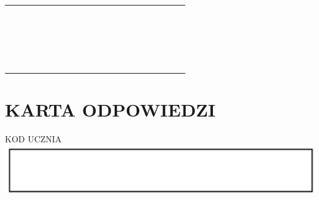 \documentclass[10pt]{article}
\begin{document}
\begin{center}
\begin{tabular}{|c|c|c|c|c|c|c|c|c|c|c|c|c|c|c|c|c|c|c|c|c|}
\hline
 &  &  &  &  &  &  &  &  &  &  &  &  &  &  &  &  &  &  &  &  \\
\hline
 &  &  &  &  &  &  &  &  &  &  &  &  &  &  &  &  &  &  &  &  \\
\hline
 &  &  &  &  &  &  &  &  &  &  &  &  &  &  &  &  &  &  &  &  \\
\hline
 &  &  &  &  &  &  &  &  &  &  &  &  &  &  &  &  &  &  &  &  \\
\hline
 &  &  &  &  &  &  &  &  &  &  &  &  &  &  &  &  &  &  &  &  \\
\hline
 &  &  &  &  &  &  &  &  &  &  &  &  &  &  &  &  &  &  &  &  \\
\hline
 &  &  &  &  &  &  &  &  &  &  &  &  &  &  &  &  &  &  &  &  \\
\hline
 &  &  &  &  &  &  &  &  &  &  &  &  &  &  &  &  &  &  &  &  \\
\hline
 &  &  &  &  &  &  &  &  &  &  &  &  &  &  &  &  &  &  &  &  \\
\hline
 &  &  &  &  &  &  &  &  &  &  &  &  &  &  &  &  &  &  &  &  \\
\hline
 &  &  &  &  &  &  &  &  &  &  &  &  &  &  &  &  &  &  &  &  \\
\hline
 &  &  &  &  &  &  &  &  &  &  &  &  &  &  &  &  &  &  &  &  \\
\hline
 &  &  &  &  &  &  &  &  &  &  &  &  &  &  &  &  &  &  &  &  \\
\hline
 &  &  &  &  &  &  &  &  &  &  &  &  &  &  &  &  &  &  &  &  \\
\hline
 &  &  &  &  &  &  &  &  &  &  &  &  &  &  &  &  &  &  &  &  \\
\hline
 &  &  &  &  &  &  &  &  &  &  &  &  &  &  &  &  &  &  &  &  \\
\hline
 &  &  &  &  &  &  &  &  &  &  &  &  &  &  &  &  &  &  &  &  \\
\hline
 &  &  &  &  &  &  &  &  &  &  &  &  &  &  &  &  &  &  &  &  \\
\hline
 &  &  &  &  &  &  &  &  &  &  &  &  &  &  &  &  &  &  &  &  \\
\hline
 &  &  &  &  &  &  &  &  &  &  &  &  &  &  &  &  &  &  &  &  \\
\hline
 &  &  &  &  &  &  &  &  &  &  &  &  &  &  &  &  &  &  &  &  \\
\hline
 &  &  &  &  &  &  &  &  &  &  &  &  &  &  &  &  &  &  &  &  \\
\hline
\end{tabular}
\end{center}

\section*{KARTA ODPOWIEDZI}
KOD UCZNIA\\
\includegraphics[max width=\textwidth, center]{2024_11_21_b63ac6eb3d78a57ac924g-16(1)}
\end{document}
